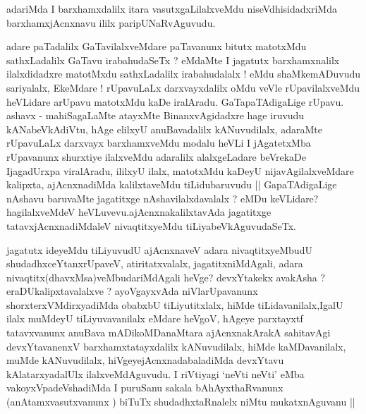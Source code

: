 \begin{artha}
adariMda I barxhamxdalilx itara vasutxgaLilalxveMdu
niseVdhisidadxriMda barxhamxjAcnxnavu ililx paripUNaRvAguvudu. 

adare paTadalilx GaTavilalxveMdare paTavanunx bitutx matotxMdu
sathxLadalilx GaTavu irabahudaSeTx ? eMdaMte I jagatutx barxhamxnalilx
ilalxdidadxre matotMxdu sathxLadalilx irabahudalalx ! eMdu
shaMkemADuvudu sariyalalx, EkeMdare ! rUpavuLaLx darxvayxdalilx oMdu
veVle rUpavilalxveMdu heVLidare arUpavu matotxMdu kaDe
iralAradu. GaTapaTAdigaLige rUpavu. ashavx - mahiSagaLaMte atayxMte
BinanxvAgidadxre hage iruvudu kANabeVkAdiVtu, hAge elilxyU
anuBavadalilx kANuvudilalx, adaraMte rUpavuLaLx darxvayx barxhamxveMdu
modalu heVLi I jAgatetxMba rUpavanunx shurxtiye ilalxveMdu adaralilx
alalxgeLadare beVrekaDe IjagadUrxpa viralAradu, ililxyU ilalx,
matotxMdu kaDeyU nijavAgilalxveMdare kalipxta, ajAcnxnadiMda
kalilxtaveMdu tiLidubaruvudu || GapaTAdigaLige nAshavu baruvaMte
jagatitxge nAshavilalxdavalalx ? eMDu keVLidare? hagilalxveMdeV
heVLuvevu.ajAcnxnakalilxtavAda jagatitxge tatavxjAcnxnadiMdaleV
nivaqtitxyeMdu tiLiyabeVkAguvudaSeTx.
\end{artha}

\begin{artha}
jagatutx ideyeMdu tiLiyuvudU ajAcnxnaveV adara nivaqtitxyeMbudU
shudadhxceYtanxrUpaveV, atiritatxvalalx, jagatitxniMdAgali, adara
nivaqtitx(dhavxMsa)veMbudariMdAgali heVge? devxYtakekx avakAsha ?
eraDUkalipxtavalalxve ? ayoVgayxvAda niVlarUpavanunx
shorxterxVMdirxyadiMda obabxbU tiLiyutitxlalx, hiMde
tiLidavanilalx,IgalU ilalx muMdeyU tiLiyuvavanilalx eMdare heVgoV,
hAgeye parxtayxtf tatavxvanunx anuBava mADikoMDanaMtara ajAcnxnakArakA
sahitavAgi devxYtavanenxV barxhamxtatayxdalilx kANuvudilalx, hiMde
kaMDavanilalx, muMde kANuvudilalx, hiVgeyejAcnxnadabaladiMda
devxYtavu kAlatarxyadalUlx ilalxveMdAguvudu. I riVtiyagi `neVti neVti'
eMba vakoyxVpadeVshadiMda I puruSanu sakala bAhAyxthaRvanunx
(anAtamxvasutxvanunx ) biTuTx shudadhxtaRnalelx niMtu mukatxnAguvanu ||
\end{artha}


\begin{center}


\end{center}

